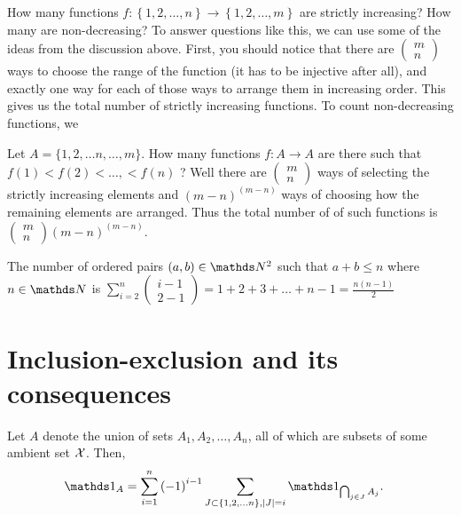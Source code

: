 \begin{example}
\label{exa:countingFunctions}How many functions $f:\left\{ 1,2,\ldots,n\right\} \to\left\{ 1,2,\ldots,m\right\} $
are strictly increasing? How many are non-decreasing? To answer questions
like this, we can use some of the ideas from the discussion above.
First, you should notice that there are $\left(\begin{array}{c}
m\\
n
\end{array}\right)$ ways to choose the range of the function (it has to be injective
after all), and exactly one way for each of those ways to arrange
them in increasing order. This gives us the total number of strictly
increasing functions. To count non-decreasing functions, we
\end{example}

\begin{example}
\label{exa:isi2016psa21}Let $A=\{1,2,\ldots n,\ldots,m\}$. How
many functions $f:A\rightarrow A$ are there such that $f(1)<f(2)<\ldots,<f(n)$
? Well there are $\left(\begin{array}{c}
m\\
n
\end{array}\right)$ ways of selecting the strictly increasing elements and $\left(m-n\right)^{\left(m-n\right)}$
ways of choosing how the remaining elements are arranged. Thus the
total number of of such functions is $\left(\begin{array}{c}
m\\
n
\end{array}\right)\left(m-n\right)^{\left(m-n\right)}.$
\end{example}

\begin{example}
\label{exa:isi2016psa11}The number of ordered pairs $\left(a,b\right)\in\N^{2}$
such that $a+b\leq n$ where $n\in\N$ is $\sum_{i=2}^{n}\left(\begin{array}{c}
i-1\\
2-1
\end{array}\right)=1+2+3+\ldots+n-1=\frac{n\left(n-1\right)}{2}$
\end{example}


\section{Inclusion-exclusion and its consequences}
\begin{lem}
\label{lem:inclusionExclusion}Let $A$ denote the union of sets $A_{1},A_{2},\ldots,A_{n}$,
all of which are subsets of some ambient set $\mathcal{X}$. Then,
\begin{align}
\indicate_{A} & =\sum_{i=1}^{n}\left(-1\right)^{i-1}\sum_{J\subset\left\{ 1,2,\ldots n\right\} ,\lvert J\rvert=i}\indicate_{\bigcap_{j\in J}A_{j}}.\label{eq:inclusionExclusionIndicator}
\end{align}
\end{lem}

